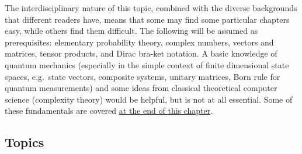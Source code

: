 \documentclass[fleqn]{article}
\begin{document}
The interdisciplinary nature of this topic, combined with the diverse backgrounds that different readers have, means that some may find some particular chapters easy, while others find them difficult.
The following will be assumed as prerequisites: elementary probability theory, complex numbers, vectors and matrices, tensor products, and Dirac bra-ket notation.
A basic knowledge of quantum mechanics (especially in the simple context of finite dimensional state spaces, e.g.~state vectors, composite systems, unitary matrices, Born rule for quantum measurements) and some ideas from classical theoretical computer science (complexity theory) would be helpful, but is not at all essential.
Some of these fundamentals are covered \protect\hyperlink{preliminaries}{at the end of this chapter}.

\hypertarget{topics}{%
\subsection*{Topics}\label{topics}}
\end{document}
